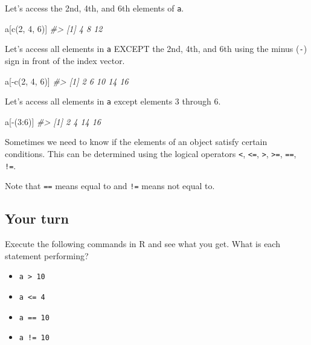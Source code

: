 \documentclass[
]{article}
\newenvironment{Shaded}{\begin{snugshade}}{\end{snugshade}}
\newcommand{\CommentTok}[1]{\textcolor[rgb]{0.56,0.35,0.01}{\textit{#1}}}
\newcommand{\DecValTok}[1]{\textcolor[rgb]{0.00,0.00,0.81}{#1}}
\newcommand{\FunctionTok}[1]{\textcolor[rgb]{0.00,0.00,0.00}{#1}}
\newcommand{\NormalTok}[1]{#1}
\newcommand{\SpecialCharTok}[1]{\textcolor[rgb]{0.00,0.00,0.00}{#1}}
\providecommand{\tightlist}{%
  \setlength{\itemsep}{0pt}\setlength{\parskip}{0pt}}
\begin{document}
Let's access the 2nd, 4th, and 6th elements of \texttt{a}.

\begin{Shaded}
\begin{Highlighting}[]
\NormalTok{a[}\FunctionTok{c}\NormalTok{(}\DecValTok{2}\NormalTok{, }\DecValTok{4}\NormalTok{, }\DecValTok{6}\NormalTok{)]}
\CommentTok{\#\textgreater{} [1]  4  8 12}
\end{Highlighting}
\end{Shaded}

Let's access all elements in \texttt{a} EXCEPT the 2nd, 4th, and 6th
using the minus (\texttt{-}) sign in front of the index vector.

\begin{Shaded}
\begin{Highlighting}[]
\NormalTok{a[}\SpecialCharTok{{-}}\FunctionTok{c}\NormalTok{(}\DecValTok{2}\NormalTok{, }\DecValTok{4}\NormalTok{, }\DecValTok{6}\NormalTok{)]}
\CommentTok{\#\textgreater{} [1]  2  6 10 14 16}
\end{Highlighting}
\end{Shaded}

Let's access all elements in \texttt{a} except elements 3 through 6.

\begin{Shaded}
\begin{Highlighting}[]
\NormalTok{a[}\SpecialCharTok{{-}}\NormalTok{(}\DecValTok{3}\SpecialCharTok{:}\DecValTok{6}\NormalTok{)]}
\CommentTok{\#\textgreater{} [1]  2  4 14 16}
\end{Highlighting}
\end{Shaded}

Sometimes we need to know if the elements of an object satisfy certain
conditions. This can be determined using the logical operators
\texttt{\textless{}}, \texttt{\textless{}=}, \texttt{\textgreater{}},
\texttt{\textgreater{}=}, \texttt{==}, \texttt{!=}.

Note that \texttt{==} means equal to and \texttt{!=} means not equal to.

\hypertarget{your-turn-11}{%
\subsection{Your turn}\label{your-turn-11}}

Execute the following commands in R and see what you get. What is each
statement performing?

\begin{itemize}
\tightlist
\item
  \texttt{a\ \textgreater{}\ 10}
\item
  \texttt{a\ \textless{}=\ 4}
\item
  \texttt{a\ ==\ 10}
\item
  \texttt{a\ !=\ 10}
\end{itemize}
\end{document}
